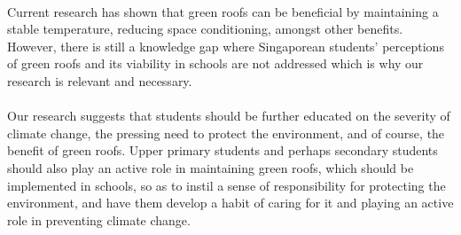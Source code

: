 \documentclass[a4paper]{article}
\begin{document}
\begin{multicols}{2}
  \paragraph{} Current research has shown that green roofs can be
  beneficial by maintaining a stable temperature, reducing space
  conditioning, amongst other benefits. However, there is still
  a knowledge gap where Singaporean students' perceptions of green
  roofs and its viability in schools are not addressed which is why our
  research is relevant and necessary.

  \paragraph{} Our research suggests that students should be further
  educated on the severity of climate change, the pressing need to protect
  the environment, and of course, the benefit of green roofs. Upper
  primary students and perhaps secondary students should also play an
  active role in maintaining green roofs, which should be implemented
  in schools, so as to instil a sense of responsibility for protecting
  the environment, and have them develop a habit of caring for it and
  playing an active role in preventing climate change.


\end{multicols}

\newpage

\printbibliography[heading=bibintoc,title={References}]

\newpage

\end{document}
